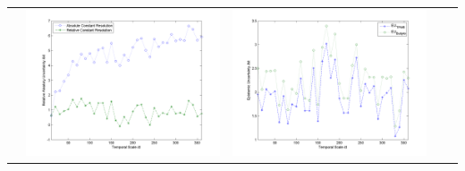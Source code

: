 \documentclass[11pt]{article}
\begin{document}
\begin{table}[H]
{\begin{tabular}{c  c   c   c  c }
&\begin{minipage}{.4\textwidth}\includegraphics[width=\linewidth]{resultgraph/06810000AU.png}\end{minipage}
&\begin{minipage}{.4\textwidth}\includegraphics[width=\linewidth]{resultgraph/06810000EU.png}\end{minipage}
\\

\end{tabular}}
\end{table}
\end{document}
